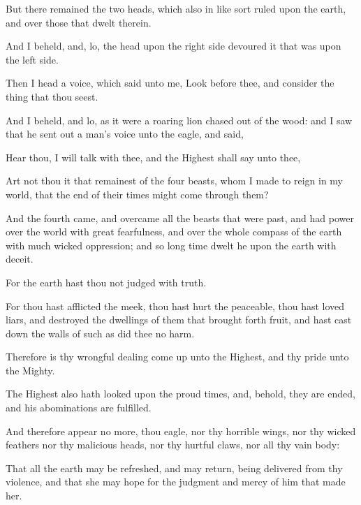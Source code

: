 {\par }{\PP {}But there remained the two heads, which also in like sort ruled upon the earth, and over those that dwelt therein.
\par }{\PP {}And I beheld, and, lo, the head upon the right side devoured it that was upon the left side.
\par }{\PP {}Then I head a voice, which said unto me, Look before thee, and consider the thing that thou seest.
\par }{\PP {}And I beheld, and lo, as it were a roaring lion chased out of the wood: and I saw that he sent out a man’s voice unto the eagle, and said,
\par }{\PP {}Hear thou, I will talk with thee, and the Highest shall say unto thee,
\par }{\PP {}Art not thou it that remainest of the four beasts, whom I made to reign in my world, that the end of their times might come through them?
\par }{\PP {}And the fourth came, and overcame all the beasts that were past, and had power over the world with great fearfulness, and over the whole compass of the earth with much wicked oppression; and so long time dwelt he upon the earth with deceit.
\par }{\PP {}For the earth hast thou not judged with truth.
\par }{\PP {}For thou hast afflicted the meek, thou hast hurt the peaceable, thou hast loved liars, and destroyed the dwellings of them that brought forth fruit, and hast cast down the walls of such as did thee no harm.
\par }{\PP {}Therefore is thy wrongful dealing come up unto the Highest, and thy pride unto the Mighty.
\par }{\PP {}The Highest also hath looked upon the proud times, and, behold, they are ended, and his abominations are fulfilled.
\par }{\PP {}And therefore appear no more, thou eagle, nor thy horrible wings, nor thy wicked feathers nor thy malicious heads, nor thy hurtful claws, nor all thy vain body:
\par }{\PP {}That all the earth may be refreshed, and may return, being delivered from thy violence, and that she may hope for the judgment and mercy of him that made her.

}
